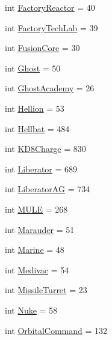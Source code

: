 \begin{DoxyCompactItemize}
\item 
int \mbox{\hyperlink{classpysc2_1_1lib_1_1units_1_1_terran_ad425fe025c7346f32f91f8abc5921558}{Factory\+Reactor}} = 40
\item 
int \mbox{\hyperlink{classpysc2_1_1lib_1_1units_1_1_terran_a72df40f81c373f6889b61f168fe7ad44}{Factory\+Tech\+Lab}} = 39
\item 
int \mbox{\hyperlink{classpysc2_1_1lib_1_1units_1_1_terran_a19bf33f3e9436874eb580d0e5ca8f5cf}{Fusion\+Core}} = 30
\item 
int \mbox{\hyperlink{classpysc2_1_1lib_1_1units_1_1_terran_a12fe72cd0314a7d442dcb459cb0d8328}{Ghost}} = 50
\item 
int \mbox{\hyperlink{classpysc2_1_1lib_1_1units_1_1_terran_a33d0a54b40f8bac5b558e1b36e78a621}{Ghost\+Academy}} = 26
\item 
int \mbox{\hyperlink{classpysc2_1_1lib_1_1units_1_1_terran_a86501a533ffda25cfd1abab24954d718}{Hellion}} = 53
\item 
int \mbox{\hyperlink{classpysc2_1_1lib_1_1units_1_1_terran_a0e5bbf94b391cdd8306b9847f2e80a23}{Hellbat}} = 484
\item 
int \mbox{\hyperlink{classpysc2_1_1lib_1_1units_1_1_terran_aa5cc922ceb8d1769e43c7ab70441f07f}{K\+D8\+Charge}} = 830
\item 
int \mbox{\hyperlink{classpysc2_1_1lib_1_1units_1_1_terran_a4df21b58c6622dc5289486d75940dd89}{Liberator}} = 689
\item 
int \mbox{\hyperlink{classpysc2_1_1lib_1_1units_1_1_terran_a231b4212e952421e2c7567d76fcb8cba}{Liberator\+AG}} = 734
\item 
int \mbox{\hyperlink{classpysc2_1_1lib_1_1units_1_1_terran_a7ea6bd76dd0a370c1e933bf1aa6540ab}{M\+U\+LE}} = 268
\item 
int \mbox{\hyperlink{classpysc2_1_1lib_1_1units_1_1_terran_a93ac91e1858e8871cfa9abf096dbeed9}{Marauder}} = 51
\item 
int \mbox{\hyperlink{classpysc2_1_1lib_1_1units_1_1_terran_ae37d4296f9752e9d7f824df4c10db59f}{Marine}} = 48
\item 
int \mbox{\hyperlink{classpysc2_1_1lib_1_1units_1_1_terran_ad67510b824a1f07c3a220785398d6d0d}{Medivac}} = 54
\item 
int \mbox{\hyperlink{classpysc2_1_1lib_1_1units_1_1_terran_aa3e24cc241207f6fc40724f35b859078}{Missile\+Turret}} = 23
\item 
int \mbox{\hyperlink{classpysc2_1_1lib_1_1units_1_1_terran_ab7c9a61296010bc8d6d480c08c4bc923}{Nuke}} = 58
\item 
int \mbox{\hyperlink{classpysc2_1_1lib_1_1units_1_1_terran_a3b1d7138c281fc4923221ec20f0e8f73}{Orbital\+Command}} = 132

\end{DoxyCompactItemize}
